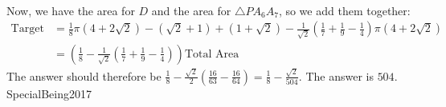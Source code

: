 \documentclass[12pt]{article}
\begin{document}
\begin{align*}
\end{align*} Now, we have the area for \(D\) and the area for \(\triangle P A_6 A_7\), so we add them together: \begin{align*}
\text{Target Area} &= \frac{1}{8} \pi \left(4+2\sqrt{2}\right)- \left(\sqrt{2}+1\right) + \left(1+\sqrt{2}\right)- \frac{1}{\sqrt{2}}\left(\frac{1}{7}+\frac{1}{9}-\frac{1}{4}\right)\pi\left(4+2\sqrt{2}\right)\\
&=\left(\frac{1}{8} - \frac{1}{\sqrt{2}}\left(\frac{1}{7}+\frac{1}{9}-\frac{1}{4}\right)\right)\text{Total Area}
\end{align*} The answer should therefore be \(\frac{1}{8}- \frac{\sqrt{2}}{2}\left(\frac{16}{63}-\frac{16}{64}\right)=\frac{1}{8}- \frac{\sqrt{2}}{504}\). The answer is \(\boxed{504}\). SpecialBeing2017
\end{document}
